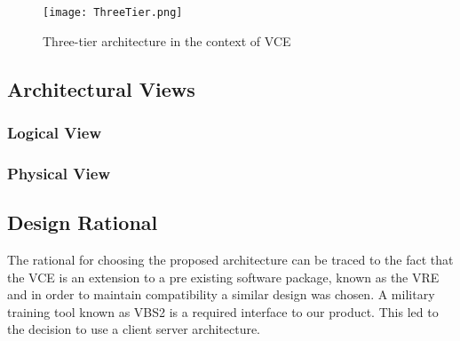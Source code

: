 \documentclass[11pt,a4paper]{report}
\begin{document}
	\begin{figure}[h!]
		\centering
		\texttt{[image: ThreeTier.png]}
		\caption{Three-tier architecture in the context of VCE}
	\end{figure}

\subsection{Architectural Views}

\subsubsection{Logical View}

\subsubsection{Physical View}

\subsection{Design Rational}

    The rational for choosing the proposed architecture can be traced to the
    fact that the VCE is an extension to a pre existing software package, known
    as the VRE and in order to maintain compatibility a similar design was
    chosen.  A military training tool known as VBS2 is a required interface to
    our product.  This led to the decision to use a client server architecture.
\end{document}
